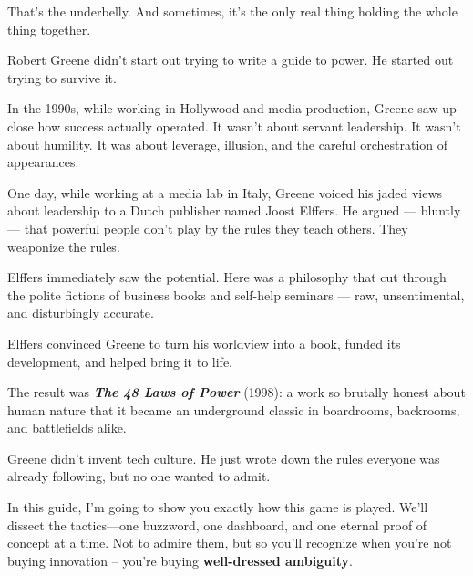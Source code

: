   That’s the underbelly.  
  And sometimes, it’s the only real thing holding the whole thing together.
 
\medskip

\begin{tcolorbox}[title=Historical Sidebar: How Cynicism Became a Business Model, colback=gray!5!white, colframe=black!80!white, fonttitle=\bfseries]

  Robert Greene didn’t start out trying to write a guide to power.  He started out trying to survive it.

  \medskip
  
  In the 1990s, while working in Hollywood and media production, Greene saw up close how success actually operated.  It wasn’t about servant leadership. It wasn’t about humility.  It was about leverage, illusion, and the careful orchestration of appearances.

  \medskip
  
  One day, while working at a media lab in Italy, Greene voiced his jaded views about leadership to a Dutch publisher named Joost Elffers.  He argued — bluntly — that powerful people don't play by the rules they teach others.  They weaponize the rules.

  \medskip
  
  Elffers immediately saw the potential.  Here was a philosophy that cut through the polite fictions of business books and self-help seminars — raw, unsentimental, and disturbingly accurate.

  \medskip
  
  Elffers convinced Greene to turn his worldview into a book, funded its development, and helped bring it to life.

  \medskip
  
  The result was \textbf{\textit{The 48 Laws of Power}} (1998): a work so brutally honest about human nature that it became an underground classic in boardrooms, backrooms, and battlefields alike.

  \medskip
  
  Greene didn’t invent tech culture.  He just wrote down the rules everyone was already following, but no one wanted to admit.
  
\end{tcolorbox}

\medskip

In this guide, I’m going to show you exactly how this game is played. We’ll dissect the tactics—one buzzword, one dashboard, and one eternal proof of concept at a time. Not to admire them, but so you’ll recognize when you're not buying innovation -- you’re buying \textbf{well-dressed ambiguity}.

